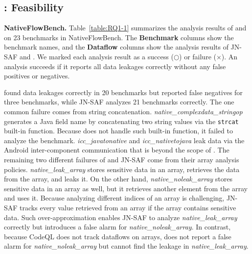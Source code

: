 \subsection{: Feasibility}
\textbf{NativeFlowBench.} Table~\ref{table:RQ1-1} summarizes the analysis
results of \ours and \jnsaf on 23 benchmarks in NativeFlowBench.
The {\bf Benchmark} columns show the benchmark names, and the {\bf Dataflow} columns show
the analysis results of JN-SAF and \ours.
We marked each analysis result as a success ($\bigcirc$) or failure ($\times$).
An analysis succeeds if it reports all data leakages correctly without any
false positives or negatives.

\ours found data leakages correctly in 20 benchmarks but reported false
negatives for three benchmarks, while JN-SAF analyzes 21 benchmarks correctly. 
The one common failure comes from string concatenation.
{\it native\_complexdata\_stringop} generates a Java field name by
concatenating two string values via the {\tt strcat} built-in function.
Because \ours does not handle such built-in function, it failed to analyze
the benchmark.
{\it icc\_javatonative} and {\it icc\_nativetojava} leak data via the Android
inter-component communication that is beyond the scope of \ours.
The remaining two different failures of \ours and JN-SAF come from their array
analysis policies.
{\it native\_leak\_array} stores sensitive data in an array, retrieves the data
from the array, and leaks it.  
On the other hand, {\it native\_noleak\_array} stores sensitive data in an
array as well, but it retrieves another element from the array and uses it.
Because analyzing different indices of an array is challenging, JN-SAF tracks
every value retrieved from an array if the array contains sensitive data.
Such over-approximation enables JN-SAF to analyze {\it native\_leak\_array}
correctly but introduces a false alarm for {\it native\_noleak\_array}.  
In contrast, because CodeQL does not track dataflows on arrays, \ours does not
report a false alarm for {\it native\_noleak\_array} but cannot find the
leakage in {\it native\_leak\_array}.

